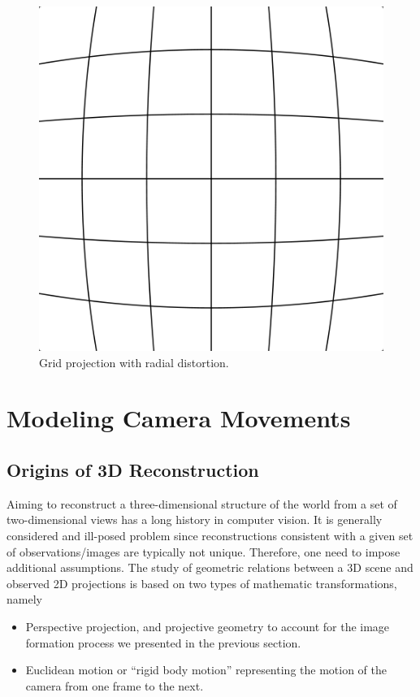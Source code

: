\begin{figure}[h]
\centering
\includegraphics[width=0.5\columnwidth]{assets/img/barrel_distortion.png}
\caption{Grid projection with radial distortion.}%
\label{fig:radial_distortion}
\end{figure}


\section{Modeling Camera Movements}%
\label{sec:moving-scene}

\subsection{Origins of 3D Reconstruction}%
\label{sub:origins_of_3d_reconstruction}

Aiming to reconstruct a three-dimensional structure of the world from
a set of two-dimensional views has a long history in computer vision.
It is generally considered and ill-posed problem since reconstructions
consistent with a given set of observations/images are typically not unique.
Therefore, one need to impose additional assumptions.
The study of geometric relations between a 3D scene
and observed 2D projections is based on two types of mathematic transformations, namely
\begin{itemize}
	\item Perspective projection, and projective geometry to account for the image formation
		process we presented in the previous section.
	\item Euclidean motion or ``rigid body motion''
		representing the motion of the camera from one frame to the next.
\end{itemize}

